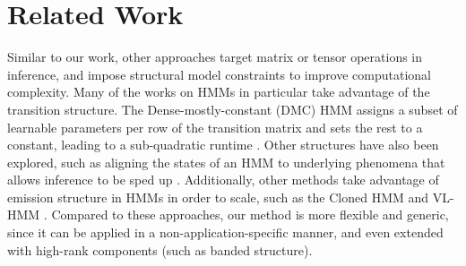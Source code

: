 \documentclass{article}
\begin{document}

\section{Related Work}

Similar to our work, other approaches target matrix or tensor operations in inference, and impose structural model constraints to improve computational complexity.
Many of the works on HMMs in particular take advantage of the transition structure.
The Dense-mostly-constant (DMC) HMM assigns a subset of learnable parameters per row of the transition matrix and sets the rest to a constant, leading to a sub-quadratic runtime \citep{dmc}.
Other structures have also been explored, such as aligning the states of an HMM to underlying phenomena that allows inference to be sped up \citep{ffthmm,constrainedhmm}.
Additionally, other methods take advantage of emission structure in HMMs in order to scale, such as the Cloned HMM \citep{dedieu2019learning} and VL-HMM \citep{chiu2020scaling}.
Compared to these approaches, our method is more flexible and generic, since it can be applied in a non-application-specific manner, and even extended with high-rank components (such as banded structure).
\end{document}
